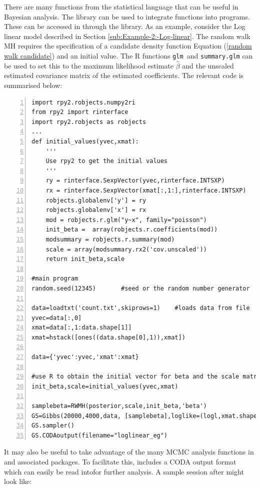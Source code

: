 \documentclass[article]{jss}
\begin{document}
There are many functions from the  statistical language
\citep{R} that can be useful in Bayesian analysis. The 
 library can be used to integrate 
functions into  programs. These can be accessed in
 through the   library. As an
example, consider the Log linear model described in Section
\ref{sub:Example-2:-Log-linear}. The random walk MH requires the
specification of a candidate density function Equation (\ref{random
  walk candidate}) and an initial value. The R functions \texttt{glm
}and \texttt{summary.glm} can be used to set this to the maximum
likelihood estimate $\hat{\beta}$ and the unscaled estimated
covariance matrix of the estimated coefficients. The relevant code is
summarised below:


\begin{lstlisting}[basicstyle={\scriptsize},numbers=left,tabsize=4]
import rpy2.robjects.numpy2ri
from rpy2 import rinterface
import rpy2.robjects as robjects
...
def initial_values(yvec,xmat):
    '''
    Use rpy2 to get the initial values
    '''
    ry = rinterface.SexpVector(yvec,rinterface.INTSXP)
    rx = rinterface.SexpVector(xmat[:,1:],rinterface.INTSXP)
    robjects.globalenv['y'] = ry
    robjects.globalenv['x'] = rx
    mod = robjects.r.glm("y~x", family="poisson")
    init_beta =  array(robjects.r.coefficients(mod))
    modsummary = robjects.r.summary(mod)
    scale = array(modsummary.rx2('cov.unscaled'))
    return init_beta,scale

#main program
random.seed(12345)       #seed or the random number generator

data=loadtxt('count.txt',skiprows=1)    #loads data from file
yvec=data[:,0]
xmat=data[:,1:data.shape[1]]
xmat=hstack([ones((data.shape[0],1)),xmat])

data={'yvec':yvec,'xmat':xmat} 

#use R to obtain the initial vector for beta and the scale matrix
init_beta,scale=initial_values(yvec,xmat)

samplebeta=RWMH(posterior,scale,init_beta,'beta')
GS=Gibbs(20000,4000,data, [samplebeta],loglike=(logl,xmat.shape[1],'yvec'))
GS.sampler()
GS.CODAoutput(filename="loglinear_eg") 

\end{lstlisting}


It may also be useful to take advantage of the many MCMC analysis
functions in  and associated packages. To facilitate this,
 includes a CODA
\citep{Rnews:Plummer+Best+Cowles+Vines:2006} output format which can
easily be read intofor further analysis. A sample
 session after  might look like:
\end{document}

